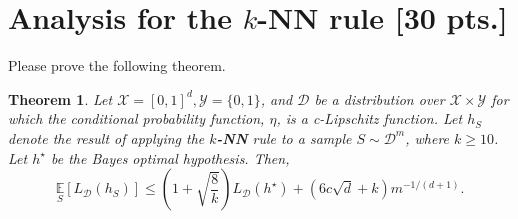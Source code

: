 \documentclass[12pt,letterpaper]{article}
\newtheorem{theorem}{Theorem}
\theoremstyle{definition}
\begin{document}
\section{Analysis for the {\bf $k$-NN} rule [30 pts.]}\vspace{-2ex}

 Please prove the following theorem.
\begin{theorem}
Let $\mathcal{X}=[0,1]^{d}, \mathcal{Y}=\{0,1\}$, and $\mathcal{D}$ be a distribution over $\mathcal{X} \times \mathcal{Y}$ for which the conditional probability function, $\eta$, is a c-Lipschitz function. Let $h_{S}$ denote the result of applying the {\bf $k$-NN} rule to a sample $S \sim \mathcal{D}^{m}$, where $k \geq 10$. Let $h^{\star}$ be the Bayes optimal hypothesis. Then,
$$
\underset{S}{\mathbb{E}}\left[L_{\mathcal{D}}\left(h_{S}\right)\right] \leq\left(1+\sqrt{\frac{8}{k}}\right) L_{\mathcal{D}}\left(h^{\star}\right)+(6 c \sqrt{d}+k) m^{-1 /(d+1)} .
$$
\end{theorem}
\end{document}
